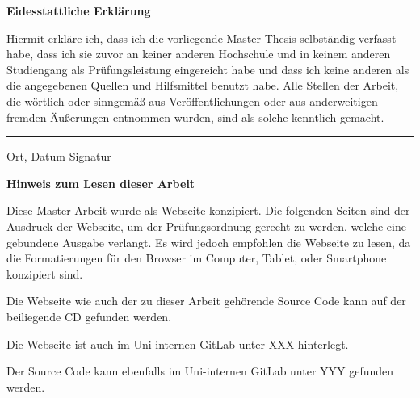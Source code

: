 \documentclass[12pt, twoside]{report}
\begin{document}

{\huge \textbf{Eidesstattliche Erklärung}} \bigskip

Hiermit  erkläre  ich,  dass  ich  die  vorliegende 
Master Thesis selbständig  verfasst  habe,  dass  ich  sie  zuvor  an  keiner  anderen  Hochschule  und  in  
keinem  anderen  Studiengang  als  Prüfungsleistung  eingereicht  habe  und  dass  ich keine  anderen  als  die  angegebenen  Quellen  und  Hilfsmittel  benutzt  habe.  Alle Stellen  der  Arbeit,  die  wörtlich  oder  sinngemäß  aus  Veröffentlichungen  oder  aus anderweitigen  fremden  Äußerungen  entnommen  wurden,  sind  als  solche  kenntlich gemacht.   
\newline
\newline
\newline
\rule{\textwidth}{1pt}
Ort, Datum \hfill Signatur


\newpage
{\huge \textbf{Hinweis zum Lesen dieser Arbeit}} \bigskip

Diese Master-Arbeit wurde als Webseite konzipiert. Die folgenden Seiten sind der Ausdruck der Webseite, um der Prüfungsordnung gerecht zu werden, welche eine gebundene Ausgabe verlangt. Es wird jedoch empfohlen die Webseite zu lesen, da die Formatierungen für den Browser im Computer, Tablet, oder Smartphone konzipiert sind.

Die Webseite wie auch der zu dieser Arbeit gehörende Source Code kann auf der beiliegende CD gefunden werden.

Die Webseite ist auch im Uni-internen GitLab unter XXX hinterlegt.

Der Source Code kann ebenfalls im Uni-internen GitLab unter YYY gefunden werden. 


\clearpage
{} 










\end{document}
